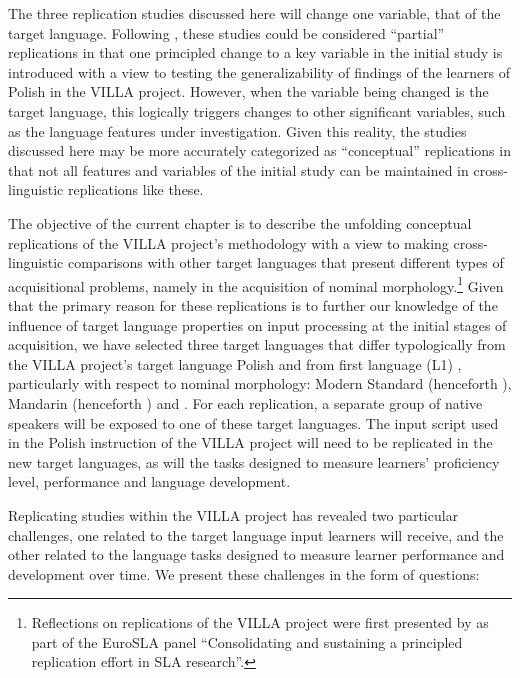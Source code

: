\documentclass[output=paper,colorlinks,citecolor=brown,modfonts,nonflat]{../langscibook}
\begin{document}
The three replication studies discussed here will change one variable, that of the target language. Following \citet{MarsdenEtAl2018Replication}, these studies could be considered “partial” replications in that one principled change to a key variable in the initial study is introduced with a view to testing the generalizability of findings of the  learners of Polish in the VILLA project. However, when the variable being changed is the target language, this logically triggers changes to other significant variables, such as the language features under investigation. Given this reality, the studies discussed here may be more accurately categorized as “conceptual” replications in that not all features and variables of the initial study can be maintained in cross-linguistic replications like these.

The objective of the current chapter is to describe the unfolding conceptual replications of the VILLA project’s methodology with a view to making cross-linguistic comparisons with other target languages that present different types of acquisitional problems, namely in the acquisition of nominal morphology.\footnote{{Reflections on replications of the VILLA project were first presented by \citet{RastEtAl2017} as part of the EuroSLA panel “Consolidating and sustaining a principled replication effort in SLA research”.}} Given that the primary reason for these replications is to further our knowledge of the influence of target language properties on input processing at the initial stages of acquisition, we have selected three target languages that differ typologically from the VILLA project’s target language Polish and from first language (L1) , particularly with respect to nominal morphology: Modern Standard  (henceforth ), Mandarin  (henceforth ) and . For each replication, a separate group of  native speakers will be exposed to one of these target languages. The input script used in the Polish instruction of the VILLA project will need to be replicated in the new target languages, as will the tasks designed to measure learners’ proficiency level, performance and language development.

Replicating studies within the VILLA project has revealed two particular challenges, one related to the target language input learners will receive, and the other related to the language tasks designed to measure learner performance and development over time. We present these challenges in the form of questions:
\end{document}
